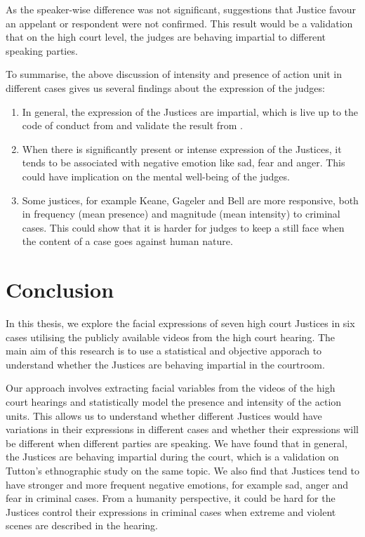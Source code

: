 \documentclass{monashthesis}
\begin{document}
As the speaker-wise difference was not significant, suggestions that Justice favour an appelant or respondent were not confirmed. This result would be a validation that on the high court level, the judges are behaving impartial to different speaking parties.

To summarise, the above discussion of intensity and presence of action unit in different cases gives us several findings about the expression of the judges:

\begin{enumerate}
\def\labelenumi{\arabic{enumi})}
\item
  In general, the expression of the Justices are impartial, which is live up to the code of conduct from \textcite{judicalguid} and validate the result from \textcite{tutton2018judicial}.
\item
  When there is significantly present or intense expression of the Justices, it tends to be associated with negative emotion like sad, fear and anger. This could have implication on the mental well-being of the judges.
\item
  Some justices, for example Keane, Gageler and Bell are more responsive, both in frequency (mean presence) and magnitude (mean intensity) to criminal cases. This could show that it is harder for judges to keep a still face when the content of a case goes against human nature.
\end{enumerate}

\hypertarget{conclusion}{%
\chapter{Conclusion}\label{conclusion}}

In this thesis, we explore the facial expressions of seven high court Justices in six cases utilising the publicly available videos from the high court hearing. The main aim of this research is to use a statistical and objective apporach to understand whether the Justices are behaving impartial in the courtroom.

Our approach involves extracting facial variables from the videos of the high court hearings and statistically model the presence and intensity of the action units. This allows us to understand whether different Justices would have variations in their expressions in different cases and whether their expressions will be different when different parties are speaking. We have found that in general, the Justices are behaving impartial during the court, which is a validation on Tutton's ethnographic study on the same topic. We also find that Justices tend to have stronger and more frequent negative emotions, for example sad, anger and fear in criminal cases. From a humanity perspective, it could be hard for the Justices control their expressions in criminal cases when extreme and violent scenes are described in the hearing.
\end{document}
